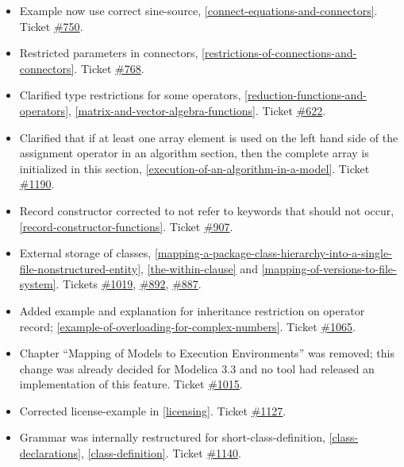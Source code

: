 \documentclass[10pt,a4paper]{report}
\begin{document}
\begin{itemize}
\item
  Example now use correct sine-source, \ref{connect-equations-and-connectors}. Ticket
  \href{https://trac.modelica.org/Modelica/ticket/750}{\#750}.
\item
  Restricted parameters in connectors, \ref{restrictions-of-connections-and-connectors}. Ticket
  \href{https://trac.modelica.org/Modelica/ticket/768}{\#768}.
\item
  Clarified type restrictions for some operators, \ref{reduction-functions-and-operators},
  \ref{matrix-and-vector-algebra-functions}. Ticket
  \href{https://trac.modelica.org/Modelica/ticket/622}{\#622}.
\item
  Clarified that if at least one array element is used on the left hand
  side of the assignment operator in an algorithm section, then the
  complete array is initialized in this section, \ref{execution-of-an-algorithm-in-a-model}. Ticket
  \href{https://trac.modelica.org/Modelica/ticket/1190}{\#1190}.
\item
  Record constructor corrected to not refer to keywords that should not
  occur, \ref{record-constructor-functions}. Ticket
  \href{https://trac.modelica.org/Modelica/ticket/907}{\#907}.
\item
  External storage of classes, \ref{mapping-a-package-class-hierarchy-into-a-single-file-nonstructured-entity}, 
  \ref{the-within-clause} and \ref{mapping-of-versions-to-file-system}.
  Tickets \href{https://trac.modelica.org/Modelica/ticket/1019}{\#1019},
  \href{https://trac.modelica.org/Modelica/ticket/892}{\#892},
  \href{https://trac.modelica.org/Modelica/ticket/887}{\#887}.
\item
  Added example and explanation for inheritance restriction on operator
  record; \ref{example-of-overloading-for-complex-numbers}. Ticket
  \href{https://trac.modelica.org/Modelica/ticket/1065}{\#1065}.
\item
  Chapter ``Mapping of Models to Execution Environments'' was removed;
  this change was already decided for Modelica 3.3 and no tool had
  released an implementation of this feature. Ticket
  \href{https://trac.modelica.org/Modelica/ticket/1015}{\#1015}.
\item
  Corrected license-example in \ref{licensing}. Ticket
  \href{https://trac.modelica.org/Modelica/ticket/1127}{\#1127}.
\item
  Grammar was internally restructured for short-class-definition,
  \ref{class-declarations}, \ref{class-definition}. Ticket
  \href{https://trac.modelica.org/Modelica/ticket/1140}{\#1140}.
\end{itemize}
\end{document}
